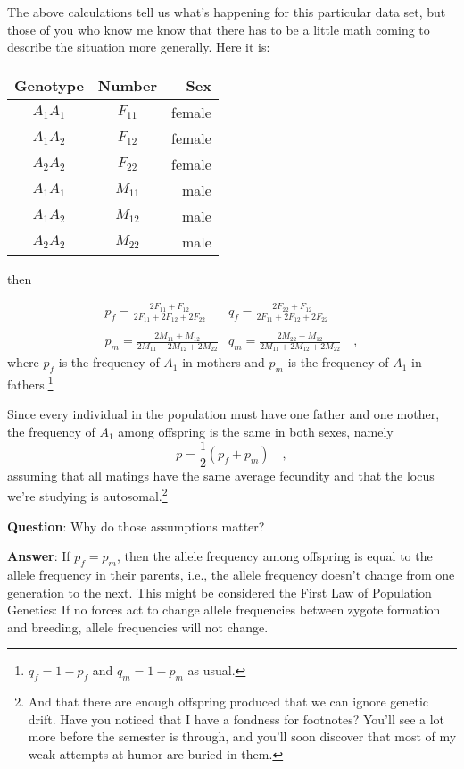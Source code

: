 The above calculations tell us what's happening for this particular
data set, but those of you who know me know that there has to be a
little math coming to describe the situation more generally. Here it
is: 

\begin{center}
\begin{tabular}{ccr}
\hline\hline
Genotype & Number & Sex \\
\hline
$A_1A_1$ & $F_{11}$ & female \\
$A_1A_2$ & $F_{12}$ & female \\
$A_2A_2$ & $F_{22}$ & female \\
$A_1A_1$ & $M_{11}$ & male \\
$A_1A_2$ & $M_{12}$ & male \\
$A_2A_2$ & $M_{22}$ & male \\
\hline
\end{tabular}
\end{center}

\noindent then

$$\begin{array}{cc}
p_f = \frac{2F_{11}+F_{12}}{2F_{11}+2F_{12}+2F_{22}} &
q_f = \frac{2F_{22}+F_{12}}{2F_{11}+2F_{12}+2F_{22}} \\
 & \\
p_m = \frac{2M_{11}+M_{12}}{2M_{11}+2M_{12}+2M_{22}} &
q_m = \frac{2M_{22}+M_{12}}{2M_{11}+2M_{12}+2M_{22}} \quad ,
\end{array}$$
where $p_f$ is the frequency of $A_1$ in mothers and $p_m$ is the
frequency of $A_1$ in fathers.\footnote{$q_f = 1 - p_f$ and $q_m = 1 -
  p_m$ as usual.}

Since every individual in the population must have one father and one
mother, the frequency of $A_1$ among offspring is the same in both
sexes, namely
\[
p = \frac{1}{2}(p_f + p_m) \quad ,
\]
assuming that all matings have the same average fecundity and that the
locus we're studying is autosomal.\footnote{And that there are enough
  offspring produced that we can ignore genetic drift. Have you
  noticed that I have a fondness for footnotes? You'll see a lot more
  before the semester is through, and you'll soon discover that most
  of my weak attempts at humor are buried in them.}

{\bf Question}: Why do those assumptions matter?

{\bf Answer}: If $p_f = p_m$, then the allele frequency among offspring
is equal to the allele frequency in their parents, i.e., the allele
frequency doesn't change from one generation to the next. This might
be considered the First Law of Population Genetics: If no forces act
to change allele frequencies between zygote formation and breeding,
allele frequencies will not change.

